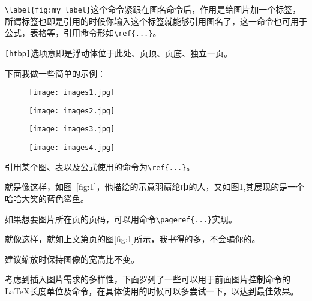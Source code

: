\verb|\label{fig:my_label}|这个命令紧跟在图名命令后，作用是给图片加一个标签，所谓标签也即是引用的时候你输入这个标签就能够引用图名了，这一命令也可用于公式，表格等，引用命令形如\verb|\ref{...}|。

\verb|[htbp]|选项意即是浮动体位于此处、页顶、页底、独立一页。

下面我做一些简单的示例：

\begin{figure}[!htb]
  \begin{minipage}[t]{0.5\linewidth}
    \centering
     \texttt{[image: images1.jpg]}
     \label{fig:1}
  \end{minipage}%
  \begin{minipage}[t]{0.5\linewidth}
    \centering
    \texttt{[image: images2.jpg]}
    \label{fig:2}
  \end{minipage}
\end{figure}

\begin{figure}[!htb]
    \begin{minipage}[t]{0.5\linewidth}
    \centering
     \texttt{[image: images3.jpg]}
     \label{fig:3}
  \end{minipage}%
  \begin{minipage}[t]{0.5\linewidth}
    \centering
    \texttt{[image: images4.jpg]}
    \label{fig:4}
  \end{minipage}
\end{figure}

引用某个图、表以及公式使用的命令为\verb|\ref{...}|。\par 
就是像这样，如图~\ref{fig:1}，他描绘的示意羽扇纶巾的人，又如图\ref{fig:2},其展现的是一个哈哈大笑的蓝色鲨鱼。\par 
如果想要图片所在页的页码，可以用命令\verb|\pageref{...}|实现。\par 
就像这样，就如上文第\pageref{fig:1}页的图\ref{fig:1}所示，我书得的多，不会骗你的。\par 
建议缩放时保持图像的宽高比不变。

考虑到插入图片需求的多样性，下面罗列了一些可以用于前面图片控制命令的\LaTeX 长度单位及命令，在具体使用的时候可以多尝试一下，以达到最佳效果。

